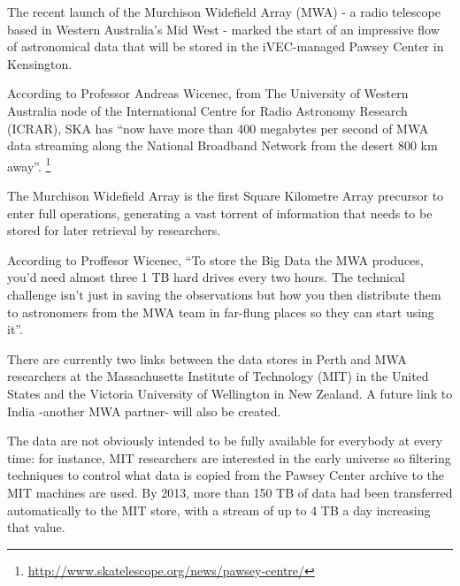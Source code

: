 

The recent launch of the Murchison Widefield Array (MWA) - a radio telescope based in Western Australia's Mid West - marked the start of an impressive flow of astronomical data that will be stored in the iVEC-managed Pawsey Center in Kensington. \newline

According to Professor Andreas Wicenec, from The University of Western Australia node of the International Centre for Radio Astronomy Research (ICRAR), SKA has ``now have more than 400 megabytes per second of MWA data streaming along the National Broadband Network from the desert 800 km away''. \footnote{\url{http://www.skatelescope.org/news/pawsey-centre/}}  \newline

The Murchison Widefield Array is the first Square Kilometre Array precursor to enter full operations, generating a vast torrent of information that needs to be stored for later retrieval by researchers. \newline

According to Proffesor Wicenec, ``To store the Big Data the MWA produces, you’d need almost three 1 TB hard drives every two hours. The technical challenge isn't just in saving the observations but how you then distribute them to astronomers from the MWA team in far-flung places so they can start using it''.

There are currently two links between the data stores in Perth and MWA researchers at the Massachusetts Institute of Technology (MIT) in the United States and the Victoria University of Wellington in New Zealand. A future link to India -another MWA partner- will also be created. \newline

The data are not obviously intended to be fully available for everybody at every time: for instance, MIT researchers are interested in the early universe so filtering techniques to control what data is copied from the Pawsey Center archive to the MIT machines are used. By 2013, more than 150 TB of data had been transferred automatically to the MIT store, with a stream of up to 4 TB a day increasing that value. \newline

